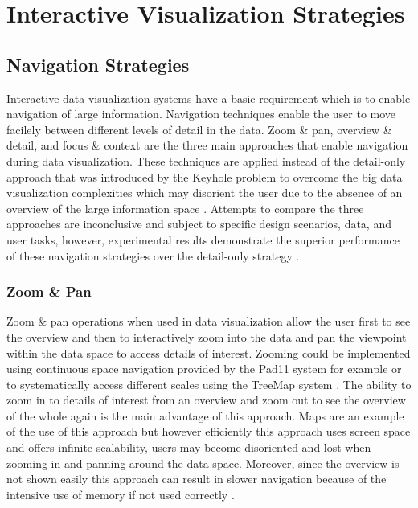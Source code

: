 \section{Interactive Visualization Strategies}

\subsection{Navigation Strategies}

Interactive data visualization systems have a basic requirement which is to enable navigation of large information. Navigation techniques enable the user to move facilely between different levels of detail in the data. Zoom \& pan, overview \& detail, and focus \& context are the three main approaches that enable navigation during data visualization. These techniques are applied instead of the detail-only approach that was introduced by the Keyhole problem to overcome the big data visualization complexities which may disorient the user due to the absence of an overview of the large information space \cite{salvendy2012handbook}. Attempts to compare the three approaches are inconclusive and subject to specific design scenarios, data, and user tasks, however, experimental results demonstrate the superior performance of these navigation strategies over the detail-only strategy \cite{hornbaek2002navigation}.

\subsubsection{Zoom \& Pan}

Zoom \& pan operations when used in data visualization allow the user first to see the overview and then to interactively zoom into the data and pan the viewpoint within the data space to access details of interest. Zooming could be implemented using continuous space navigation provided by the Pad11 system \cite{bederson1994pad++} for example or to systematically access different scales using the TreeMap system \cite{johnson1999tree}. The ability to zoom in to details of interest from an overview and zoom out to see the overview of the whole again is the main advantage of this approach. Maps are an example of the use of this approach but however efficiently this approach uses screen space and offers infinite scalability, users may become disoriented and lost when zooming in and panning around the data space. Moreover, since the overview is not shown easily this approach can result in slower navigation because of the intensive use of memory if not used correctly \cite{salvendy2012handbook}. 

